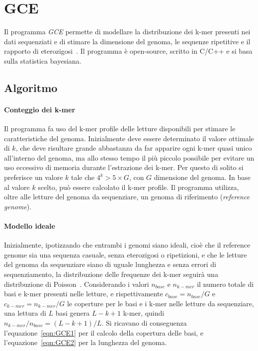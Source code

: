 \documentclass[crop=false, class=book]{standalone}
\begin{document}
	\section{GCE}
	\label{sec:GCE}
	Il programma \textit{GCE} permette di modellare la distribuzione dei k-mer presenti nei dati sequenziati e di stimare la dimensione del genoma, le sequenze ripetitive e il rapporto di eterozigosi~\cite{liu2013GCE}. Il programma è open-source, scritto in C/C++ e si basa sulla statistica bayesiana.
	
	\subsection{Algoritmo}
	\paragraph{Conteggio dei k-mer}
	Il programma fa uso del k-mer profile delle letture disponibili per stimare le caratteristiche del genoma. Inizialmente deve essere determinato il valore ottimale di $k$, che deve risultare grande abbastanza da far apparire ogni k-mer quasi unico all'interno del genoma, ma allo stesso tempo il più piccolo possibile per evitare un uso eccessivo di memoria durante l'estrazione dei k-mer. Per questo di solito si preferisce un valore $k$ tale che $4^k>5 \times G$, con $G$ dimensione del genoma. In base al valore $k$ scelto, può essere calcolato il k-mer profile.
	Il programma utilizza, oltre alle letture del genoma da sequenziare, un genoma di riferimento (\textit{reference genome}).
	
	\paragraph{Modello ideale}
	Inizialmente, ipotizzando che entrambi i genomi siano ideali, cioè che il reference genome sia una sequenza casuale, senza eterozigosi o ripetizioni, e che le letture del genoma da sequenziare siano di uguale lunghezza e senza errori di sequenziamento, la distribuzione delle frequenze dei k-mer seguirà una distribuzione di Poisson~\cite{li2003estimating}. Considerando i valori $n_{base}$ e $n_{k-mer}$ il numero totale di basi e k-mer presenti nelle letture, e rispettivamente $c_{base} = n_{base}/G$ e $c_{k-mer} = n_{k-mer}/G$ le coperture per le basi e i k-mer nelle letture da sequenziare, una lettura di $L$ basi genera $L-k+1$ k-mer, quindi $n_{k-mer} / n_{base} = (L-k+1)/L$. Si ricavano di conseguenza l'equazione~\vref{eqn:GCE1} per il calcolo della copertura delle basi, e l'equazione~\vref{eqn:GCE2} per la lunghezza del genoma.
	
\end{document}
